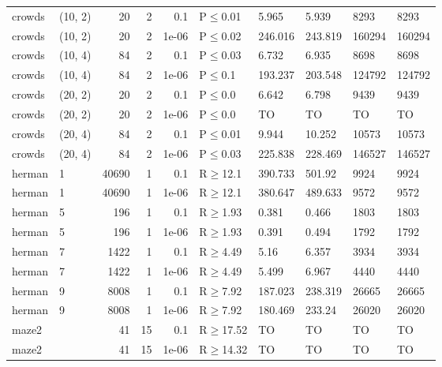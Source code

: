 \begin{longtable}{llrrrlllll}
 crowds        & (10, 2)   &     	20 &   2 & 0.1   & P$\leq$0.01  & 5.965    & 5.939    & 8293    & 8293    \\
 crowds        & (10, 2)   &     	20 &   2 & 1e-06 & P$\leq$0.02  & 246.016  & 243.819  & 160294  & 160294  \\
 crowds        & (10, 4)   &     	84 &   2 & 0.1   & P$\leq$0.03  & 6.732    & 6.935    & 8698    & 8698    \\
 crowds        & (10, 4)   &     	84 &   2 & 1e-06 & P$\leq$0.1   & 193.237  & 203.548  & 124792  & 124792  \\
 crowds        & (20, 2)   &     	20 &   2 & 0.1   & P$\leq$0.0   & 6.642    & 6.798    & 9439    & 9439    \\
 crowds        & (20, 2)   &     	20 &   2 & 1e-06 & P$\leq$0.0   & TO       & TO       & TO      & TO      \\
 crowds        & (20, 4)   &     	84 &   2 & 0.1   & P$\leq$0.01  & 9.944    & 10.252   & 10573   & 10573   \\
 crowds        & (20, 4)   &     	84 &   2 & 1e-06 & P$\leq$0.03  & 225.838  & 228.469  & 146527  & 146527  \\
 herman        & 1         &  	40690 &   1 & 0.1   & R$\geq$12.1  & 390.733  & 501.92   & 9924    & 9924    \\
 herman        & 1         &  	40690 &   1 & 1e-06 & R$\geq$12.1  & 380.647  & 489.633  & 9572    & 9572    \\
 herman        & 5         &    	196 &   1 & 0.1   & R$\geq$1.93  & 0.381    & 0.466    & 1803    & 1803    \\
 herman        & 5         &    	196 &   1 & 1e-06 & R$\geq$1.93  & 0.391    & 0.494    & 1792    & 1792    \\
 herman        & 7         &   	1422 &   1 & 0.1   & R$\geq$4.49  & 5.16     & 6.357    & 3934    & 3934    \\
 herman        & 7         &   	1422 &   1 & 1e-06 & R$\geq$4.49  & 5.499    & 6.967    & 4440    & 4440    \\
 herman        & 9         &   	8008 &   1 & 0.1   & R$\geq$7.92  & 187.023  & 238.319  & 26665   & 26665   \\
 herman        & 9         &   	8008 &   1 & 1e-06 & R$\geq$7.92  & 180.469  & 233.24   & 26020   & 26020   \\
 maze2         &           &     	41 &  15 & 0.1   & R$\geq$17.52 & TO       & TO       & TO      & TO      \\
 maze2         &           &     	41 &  15 & 1e-06 & R$\geq$14.32 & TO       & TO       & TO      & TO      \\

\end{longtable}
